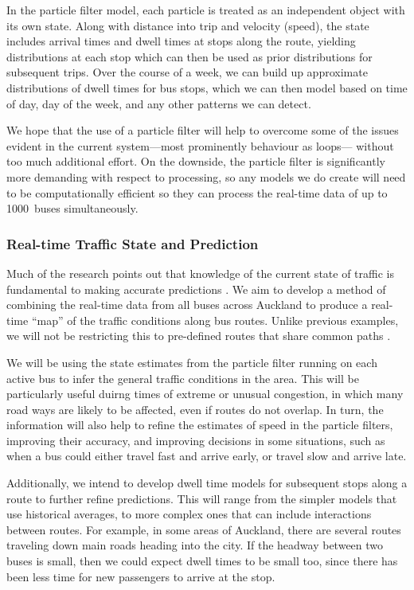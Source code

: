 \documentclass[12pt,a4paper]{article}
\newcommand{\pf}{particle filter}
\begin{document}
In the particle filter model,
each particle is treated as an independent object with its own state.
Along with distance into trip and velocity (speed),
the state includes arrival times and dwell times at stops along the route,
yielding distributions at each stop which can then be used
as prior distributions for subsequent trips.
Over the course of a week, 
we can build up approximate distributions of dwell times for bus stops,
which we can then model based on time of day, day of the week,
and any other patterns we can detect.


We hope that the use of a \pf{} will help to overcome some of the issues
evident in the current system---most prominently behaviour as loops---%
without too much additional effort.
On the downside, the \pf{} is significantly more demanding with respect to processing, 
so any models we do create will need to be computationally efficient
so they can process the real-time data of up to 1000~buses simultaneously.



\subsubsection*{Real-time Traffic State and Prediction}

Much of the research points out that knowledge of the current state of traffic
is fundamental to making accurate predictions \citep{cn}.
We aim to develop a method of combining the real-time data from
all buses across Auckland
to produce a real-time ``map'' of the traffic conditions along bus routes.
Unlike previous examples,
we will not be restricting this to pre-defined routes that share common paths
\citep{yu-etal:2010}.


We will be using the state estimates from the \pf{} running on each active bus to infer
the general traffic conditions in the area.
This will be particularly useful duirng times of extreme or unusual congestion,
in which many road ways are likely to be affected,
even if routes do not overlap.
In turn, the information will also help to refine the estimates of speed in the \pf{}s,
improving their accuracy,
and improving decisions in some situations,
such as when a bus could either travel fast and arrive early, 
or travel slow and arrive late.


Additionally, we intend to develop dwell time models for subsequent stops along a route
to further refine predictions.
This will range from the simpler models that use historical averages,
to more complex ones that can include interactions between routes.
For example, in some areas of Auckland,
there are several routes traveling down main roads heading into the city.
If the headway between two buses is small,
then we could expect dwell times to be small too, since there has been less time for
new passengers to arrive at the stop.
\end{document}
